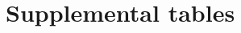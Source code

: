 \documentclass{article}
\begin{document}





\clearpage

\section{Supplemental tables}
\end{document}

